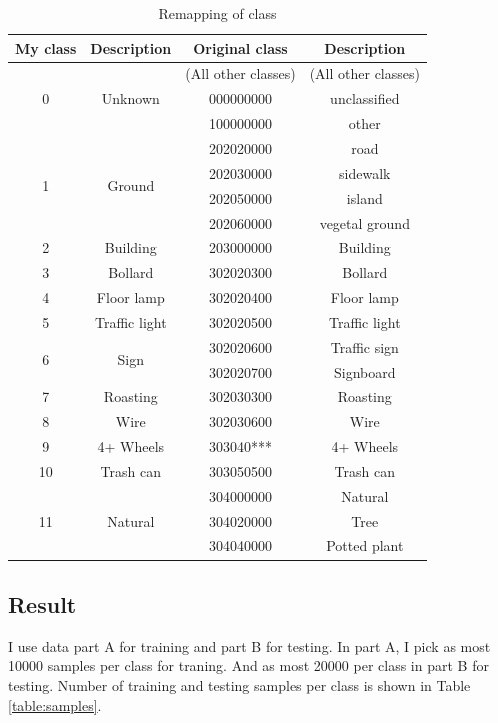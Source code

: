\documentclass{article}
\begin{document}
\begin{table}[h!]
	\centering
	\begin{tabular}{|c|c|c|c|} 
		\hline
		My class & Description & Original class & Description\\
		\hline
		\multirow{3}{*}{0} & \multirow{3}{*}{Unknown} &
		(All other classes) & (All other classes)\\
		& & 000000000  & unclassified \\
		& & 100000000  & other \\
		\hline
		\multirow{4}{*}{1} & \multirow{4}{*}{Ground} &
		202020000 & road \\
		& & 202030000 & sidewalk \\
		& & 202050000 & island \\
		& & 202060000 & vegetal ground\\
		\hline
		2 & Building & 203000000 & Building \\
		\hline
		3 & Bollard & 302020300 & Bollard \\
		\hline
		4 & Floor lamp & 302020400 & Floor lamp \\
		\hline
		5 & Traffic light & 302020500 & Traffic light \\
		\hline
		\multirow{2}{*}{6} & \multirow{2}{*}{Sign} &
		302020600  & Traffic sign \\
		& & 302020700  & Signboard \\
		\hline
		7 & Roasting & 302030300 & Roasting \\
		\hline
		8 & Wire & 302030600 & Wire \\
		\hline
		9 & 4+ Wheels & 303040*** & 4+ Wheels \\
		\hline
		10 & Trash can & 303050500 & Trash can \\
		\hline
		\multirow{3}{*}{11} & \multirow{3}{*}{Natural} &
		    304000000  & Natural\\
		& & 304020000  & Tree \\
		& & 304040000  & Potted plant \\
		\hline
	\end{tabular}
	\caption{Remapping of class}
	\label{table:class}
\end{table}

\subsection{Result}
I use data part A for training and part B for testing. In part A, I pick as most 10000 samples per class for traning. And as most 20000 per class in part B for testing. Number of training and testing samples per class is shown in Table \ref{table:samples}.
\end{document}

